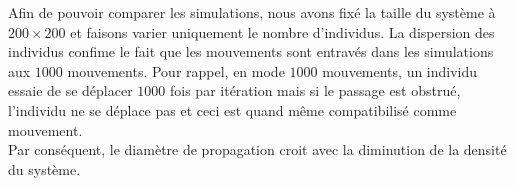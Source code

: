 Afin de pouvoir comparer les simulations, nous avons fixé la taille du système à $200 \times 200$ et faisons varier uniquement le nombre d'individus. La dispersion des individus confime le fait que les mouvements sont entravés dans les simulations aux $1000$ mouvements. Pour rappel, en mode $1000$ mouvements, un individu essaie de se déplacer $1000$ fois par itération mais si le passage est obstrué, l'individu ne se déplace pas et ceci est quand même compatibilisé comme mouvement.\\

Par conséquent, le diamètre de propagation croit avec la diminution de la densité du système. 